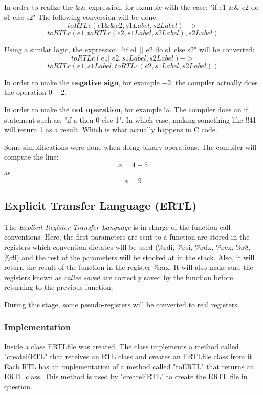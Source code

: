 \documentclass[conference]{IEEEtran}
\theoremstyle{definition}
\begin{document}
In order to realize the \&\& expression, for example with the case:
"if e1 \&\& e2 do s1 else s2"
The following conversion will be done:
\[toRTLc(e1 \&\& e2, s1Label, s2Label) -> \]
\[toRTLc(e1, toRTLc(e2, s1Label, s2Label), s2Label)\]

Using a similar logic, the expression:
"if e1 $|$$|$ e2 do s1 else s2"
will be converted:
\[toRTLc(e1 || e2, s1Label, s2Label) -> \]
\[toRTLc(e1, s1Label, toRTLc(e2, s1Label, s2Label))\]

In order to make the \textbf{negative sign}, for example \(-2\), the compiler actually does the operation \(0 - 2\).

In order to make the \textbf{not operation}, for example !a. The compiler does an if statement such as:
"if a then 0 else 1".
In which case, making something like !!41 will return 1 as a result. Which is what actually happens in C code.

Some simplifications were done when doing binary operations. The compiler will compute the line:
\[ x = 4 + 5\]
as
\[x = 9\]


\subsection{Explicit Transfer Language (ERTL)}

The \textit{Explicit Register Transfer Language} is in charge of the function call conventions. Here, the first parameters are sent to a function are stored in the registers which convention dictates will be used (\%rdi, \%rsi, \%rdx, \%rcx, \%r8, \%r9) and the rest of the parameters will be stocked at in the stack. Also, it will return the result of the function in the register \%rax. It will also make sure the registers known as \textit{callee saved} are correctly saved by the function before returning to the previous function.

During this stage, some pseudo-registers will be converted to real registers.

\subsubsection{Implementation} \label{sec:ERTL-implementation}

Inside a class ERTLfile was created. The class implements a method called "createERTL" that receives an RTL class and creates an ERTLfile class from it. Each RTL has an implementation of a method called "toERTL" that returns an ERTL class. This method is used by "createERTL" to create the ERTL file in question.
\end{document}
